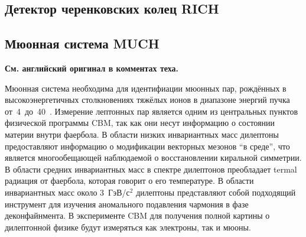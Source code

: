 \subsection{Детектор черенковских колец RICH}\label{sec:secRICH}



\subsection{Мюонная система MUCH}\label{sec:secMUCH}

\textbf{См. английский оригинал в комментах теха.}


Мюонная система необходима для идентифиации мюонных пар, рождённых в высокоэнергетичных столкновениях тяжёлых ионов в диапазоне энергий пучка от~4~до~40~\GeVperNucl. Измерение лептонных пар является одним из центральных пунктов физической программы CBM, так как они несут информацию о состоянии материи внутри фаербола. В области низких инвариантных масс дилептоны предоставляют информацию о модификации векторных мезонов ``в среде'', что является многообещающей наблюдаемой о восстановлении киральной симметрии. В области средних инвариантных масс в спектре дилептонов преобладает termal \todo радиация от фаербола, которая говорит о его температуре. В области инвариантных масс около 3~ГэВ/с$^{2} $ дилептоны представляют собой подходящий инструмент для изучения аномального подавления чармония в фазе деконфайнмента. В эксперименте CBM для получения полной картины о дилептонной физике будут измеряться как электроны, так и мюоны.


